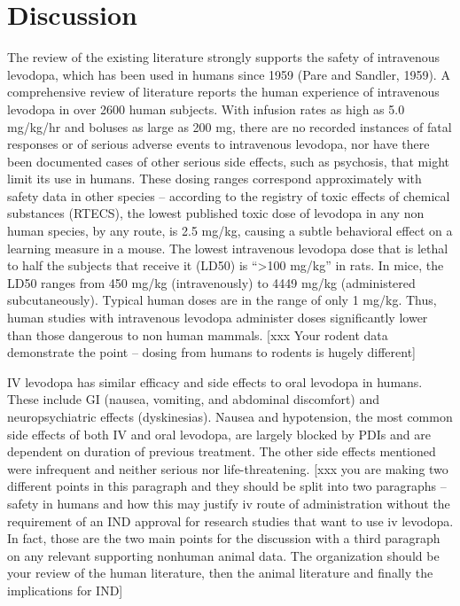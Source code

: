 \section{Discussion}
The review of the existing literature strongly supports the safety of intravenous levodopa, which has been used in humans since 1959 (Pare and Sandler, 1959).  A comprehensive review of literature reports the human experience of intravenous levodopa in over 2600 human subjects.  With infusion rates as high as 5.0 mg/kg/hr and boluses as large as 200 mg, there are no recorded instances of fatal responses or of serious adverse events to intravenous levodopa, nor have there been documented cases of other serious side effects, such as psychosis, that might limit its use in humans.  These dosing ranges correspond approximately with safety data in other species – according to the registry of toxic effects of chemical substances (RTECS), the lowest published toxic dose of levodopa in any non human species, by any route, is 2.5 mg/kg, causing a subtle behavioral effect on a learning measure in a mouse.  The lowest intravenous levodopa dose that is lethal to half the subjects that receive it (LD50) is “>100 mg/kg” in rats.  In mice, the LD50 ranges from 450 mg/kg (intravenously) to 4449 mg/kg (administered subcutaneously).  Typical human doses are in the range of only 1 mg/kg.  Thus, human studies with intravenous levodopa administer doses significantly lower than those dangerous to non human mammals. [xxx Your rodent data demonstrate the point – dosing from humans to rodents is hugely different]

IV levodopa has similar efficacy and side effects to oral levodopa in humans.  These include GI (nausea, vomiting, and abdominal discomfort) and neuropsychiatric effects (dyskinesias).  Nausea and hypotension, the most common side effects of both IV and oral levodopa, are largely blocked by PDIs and are dependent on duration of previous treatment.  The other side effects mentioned were infrequent and neither serious nor life-threatening. [xxx you are making two different points in this paragraph and they should be split into two paragraphs – safety in humans and how this may justify iv route of administration without the requirement of an IND approval for research studies that want to use iv levodopa.  In fact, those are the two main points for the discussion with a third paragraph on any relevant supporting nonhuman animal data.  The organization should be your review of the human literature, then the animal literature and finally the implications for IND] 

